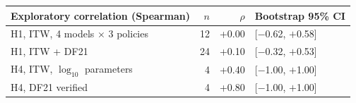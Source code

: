 \begin{tabular}{@{}lrrl@{}}
\toprule
Exploratory correlation (Spearman) & $n$ & $\rho$ & Bootstrap 95\% CI \\
\midrule
H1, ITW, 4 models $\times$ 3 policies & 12 & +0.00 & [$-$0.62, $+$0.58] \\
H1, ITW + DF21 & 24 & +0.10 & [$-$0.32, $+$0.53] \\
H4, ITW, $\log_{10}$ parameters & 4 & +0.40 & [$-$1.00, $+$1.00] \\
H4, DF21 verified & 4 & +0.80 & [$-$1.00, $+$1.00] \\
\bottomrule
\end{tabular}
